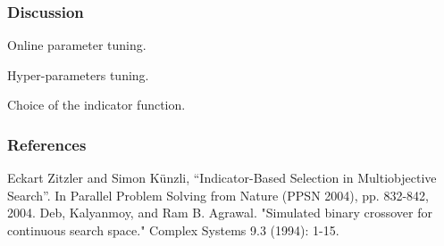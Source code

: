\documentclass[12pt]{beamer}
\begin{document}
      \begin{frame}
    \frametitle{Discussion}
    Online parameter tuning.
    
    Hyper-parameters tuning.
    
    Choice of the indicator function.
  \end{frame}
  
  \begin{frame}
  \end{frame}
  
    
  
\begin{frame}[allowframebreaks]
  \frametitle<presentation>{References}    
\begin{thebibliography}{}
\beamertemplatearticlebibitems
{} Eckart Zitzler and Simon Künzli, “Indicator-Based Selection in Multiobjective Search”. In Parallel Problem Solving from Nature (PPSN 2004), pp. 832-842, 2004.
 Deb, Kalyanmoy, and Ram B. Agrawal. "Simulated binary crossover for continuous search space." Complex Systems 9.3 (1994): 1-15.
\end{thebibliography}
\end{frame}
\end{document}
